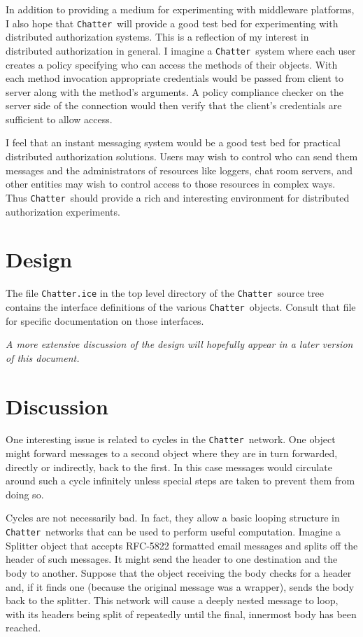 \documentclass[twocolumn]{article}
\newcommand{\Chatter}{\texttt{Chatter}}
\begin{document}
In addition to providing a medium for experimenting with middleware platforms, I also hope that
\Chatter\ will provide a good test bed for experimenting with distributed authorization systems.
This is a reflection of my interest in distributed authorization in general. I imagine a
\Chatter\ system where each user creates a policy specifying who can access the methods of their
objects. With each method invocation appropriate credentials would be passed from client to
server along with the method's arguments. A policy compliance checker on the server side of the
connection would then verify that the client's credentials are sufficient to allow access.

I feel that an instant messaging system would be a good test bed for practical distributed
authorization solutions. Users may wish to control who can send them messages and the
administrators of resources like loggers, chat room servers, and other entities may wish to
control access to those resources in complex ways. Thus \Chatter\ should provide a rich and
interesting environment for distributed authorization experiments.

\section{Design}

The file \texttt{Chatter.ice} in the top level directory of the \Chatter\ source tree contains
the interface definitions of the various \Chatter\ objects. Consult that file for specific
documentation on those interfaces.

\textit{A more extensive discussion of the design will hopefully appear in a later version of
  this document.}

\section{Discussion}

One interesting issue is related to cycles in the \Chatter\ network. One object might forward
messages to a second object where they are in turn forwarded, directly or indirectly, back to
the first. In this case messages would circulate around such a cycle infinitely unless special
steps are taken to prevent them from doing so.


Cycles are not necessarily bad. In fact, they allow a basic looping structure in \Chatter\
networks that can be used to perform useful computation. Imagine a Splitter object that accepts
RFC-5822 formatted email messages and splits off the header of such messages. It might send the
header to one destination and the body to another. Suppose that the object receiving the body
checks for a header and, if it finds one (because the original message was a wrapper), sends the
body back to the splitter. This network will cause a deeply nested message to loop, with its
headers being split of repeatedly until the final, innermost body has been reached.
\end{document}
